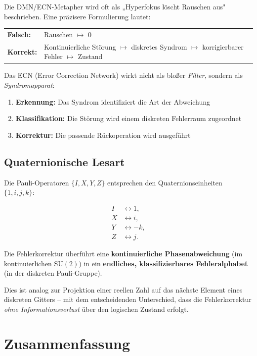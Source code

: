 \documentclass[11pt,a4paper]{article}
\begin{document}
Die DMN/ECN-Metapher wird oft als „Hyperfokus löscht Rauschen aus" beschrieben. Eine präzisere Formulierung lautet:

\begin{center}
\begin{tabular}{ll}
\textbf{Falsch:} & Rauschen $\mapsto$ 0 \\
\textbf{Korrekt:} & Kontinuierliche Störung $\mapsto$ diskretes Syndrom $\mapsto$ korrigierbarer Fehler $\mapsto$ Zustand
\end{tabular}
\end{center}

Das ECN (Error Correction Network) wirkt nicht als bloßer \textit{Filter}, sondern als \textit{Syndromapparat}:

\begin{enumerate}
\item \textbf{Erkennung:} Das Syndrom identifiziert die Art der Abweichung
\item \textbf{Klassifikation:} Die Störung wird einem diskreten Fehlerraum zugeordnet
\item \textbf{Korrektur:} Die passende Rückoperation wird ausgeführt
\end{enumerate}

\subsection{Quaternionische Lesart}

Die Pauli-Operatoren $\{I, X, Y, Z\}$ entsprechen den Quaternionseinheiten $\{1, i, j, k\}$:

\begin{align}
I &\leftrightarrow 1, \\
X &\leftrightarrow i, \\
Y &\leftrightarrow -k, \\
Z &\leftrightarrow j.
\end{align}

Die Fehlerkorrektur überführt eine \textbf{kontinuierliche Phasenabweichung} (im kontinuierlichen $\text{SU}(2)$) in ein \textbf{endliches, klassifizierbares Fehleralphabet} (in der diskreten Pauli-Gruppe).

Dies ist analog zur Projektion einer reellen Zahl auf das nächste Element eines diskreten Gitters -- mit dem entscheidenden Unterschied, dass die Fehlerkorrektur \textit{ohne Informationsverlust} über den logischen Zustand erfolgt.

\section{Zusammenfassung}
\end{document}
